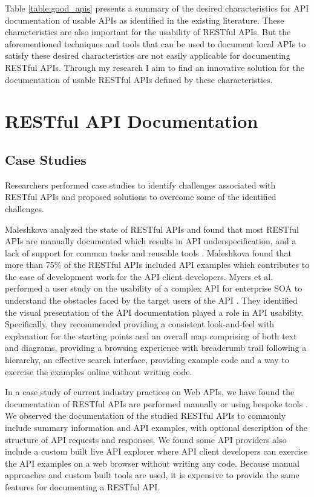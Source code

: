 \documentclass[11pt,oneside]{book}
\begin{document}
Table \ref{table:good_apis} presents a summary of the desired characteristics for API documentation of usable APIs as identified in the existing literature. These characteristics are also important for the usability of RESTful APIs. But the aforementioned techniques and tools that can be used to document local APIs to satisfy these desired characteristics are not easily applicable for documenting RESTful APIs. Through my research I aim to find an innovative solution for the documentation of usable RESTful APIs defined by these characteristics.

\section{RESTful API Documentation} %
\subsection{Case Studies} %
\label{sub:case_studies}

Researchers performed case studies to identify challenges associated with RESTful APIs and proposed solutions to overcome some of the identified challenges.

Maleshkova analyzed the state of RESTful APIs and found that most RESTful APIs are manually documented which results in API underspecification, and a lack of support for common tasks and reusable tools \cite{Maleshkova_investigating}. Maleshkova found that more than 75\% of the RESTful APIs included API examples which contributes to the ease of development work for the API client developers. Myers et al. performed a user study on the usability of a complex API for enterprise SOA to understand the obstacles faced by the target users of the API \cite{Myers_study}. They identified the visual presentation of the API documentation played a role in API usability. Specifically, they recommended providing a consistent look-and-feel with explanation for the starting points and an overall map comprising of both text and diagrams, providing a browsing experience with breadcrumb trail following a hierarchy, an effective search interface, providing example code and a way to exercise the examples online without writing code.

In a case study of current industry practices on Web APIs, we have found the documentation of RESTful APIs are performed manually or using bespoke tools \cite{sohan2015case}. We observed the documentation of the studied RESTful APIs to commonly include summary information and API examples, with optional description of the structure of API requests and responses. We found some API providers also include a custom built live API explorer where API client developers can exercise the API examples on a web browser without writing any code. Because manual approaches and custom built tools are used, it is expensive to provide the same features for documenting a RESTful API.
\end{document}
